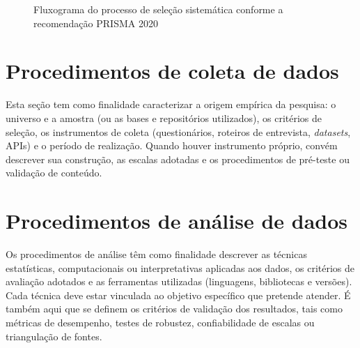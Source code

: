 \begin{figure}[H]
  \centering
  \caption{Fluxograma do processo de seleção sistemática conforme a recomendação PRISMA 2020}
  \label{fig:diagrama_prisma}
\end{figure}

\section{Procedimentos de coleta de dados}
\label{sec:coleta}
Esta seção tem como finalidade caracterizar a origem empírica da pesquisa: o universo e a amostra (ou as bases e repositórios utilizados), os critérios de seleção, os instrumentos de coleta (questionários, roteiros de entrevista, \textit{datasets}, APIs) e o período de realização. Quando houver instrumento próprio, convém descrever sua construção, as escalas adotadas e os procedimentos de pré-teste ou validação de conteúdo.

\section{Procedimentos de análise de dados}
\label{sec:analise}
Os procedimentos de análise têm como finalidade descrever as técnicas estatísticas, computacionais ou interpretativas aplicadas aos dados, os critérios de avaliação adotados e as ferramentas utilizadas (linguagens, bibliotecas e versões). Cada técnica deve estar vinculada ao objetivo específico que pretende atender. É também aqui que se definem os critérios de validação dos resultados, tais como métricas de desempenho, testes de robustez, confiabilidade de escalas ou triangulação de fontes.

